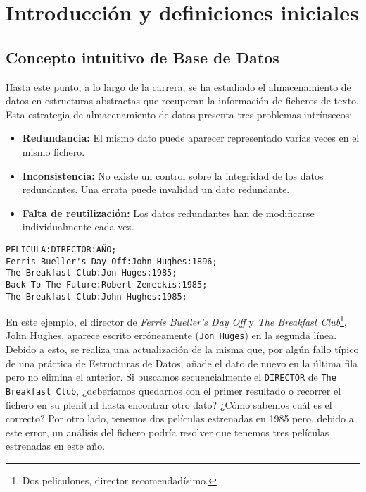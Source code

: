 \chapter{Introducción y definiciones iniciales}

\section{Concepto intuitivo de Base de Datos}

Hasta este punto, a lo largo de la carrera, se ha estudiado el almacenamiento de datos en estructuras abstractas que recuperan la información de ficheros de texto.
Esta estrategia de almacenamiento de datos presenta tres problemas intrínsecos:

\begin{itemize}
	\item\textbf{Redundancia:} El mismo dato puede aparecer representado varias veces en el mismo fichero.
	\item\textbf{Inconsistencia:} No existe un control sobre la integridad de los datos redundantes. Una errata puede invalidad un dato redundante.
	\item\textbf{Falta de reutilización:} Los datos redundantes han de modificarse individualmente cada vez.
\end{itemize}

\begin{lstlisting}
PELICULA:DIRECTOR:AÑO;
Ferris Bueller's Day Off:John Hughes:1896;
The Breakfast Club:Jon Huges:1985;
Back To The Future:Robert Zemeckis:1985;
The Breakfast Club:John Hughes:1985;
\end{lstlisting}

En este ejemplo, el director de \textit{Ferris Bueller's Day Off} y \textit{The Breakfast Club}\footnote{Dos peliculones, director recomendadísimo.}, John Hughes, aparece escrito erróneamente (\texttt{Jon Huges}) en la segunda línea.
Debido a esto, se realiza una actualización de la misma que, por algún fallo típico de una práctica de Estructuras de Datos, añade el dato de nuevo en la última fila pero no elimina el anterior.
Si buscamos secuencialmente el \texttt{DIRECTOR} de \texttt{The Breakfast Club}, ¿deberíamos quedarnos con el primer resultado o recorrer el fichero en su plenitud hasta encontrar otro dato? ¿Cómo sabemos cuál es el correcto?
Por otro lado, tenemos dos películas estrenadas en 1985 pero, debido a este error, un análisis del fichero podría resolver que tenemos tres películas estrenadas en este año.

